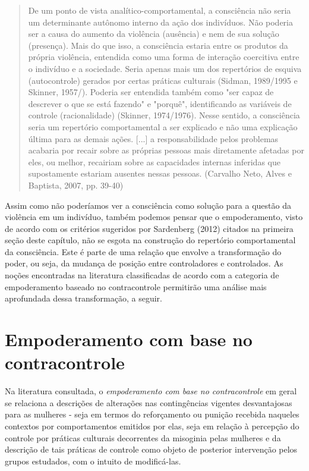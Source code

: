 \begin{quote}
    De um ponto de vista analítico-comportamental, a consciência não seria um determinante autônomo interno da ação dos indivíduos. Não poderia ser a causa do aumento da violência (ausência) e nem de sua solução (presença). Mais do que isso, a consciência estaria entre os produtos da própria violência, entendida como uma forma de interação coercitiva entre o indivíduo e a sociedade. Seria apenas mais um dos repertórios de esquiva (autocontrole) gerados por certas práticas culturais (Sidman, 1989/1995 e Skinner, 1957/). Poderia ser entendida também como "ser capaz de descrever o que se está fazendo" e "porquê", identificando as variáveis de controle (racionalidade) (Skinner, 1974/1976). Nesse sentido, a consciência seria um repertório comportamental a ser explicado e não uma explicação última para as demais ações. [...] a responsabilidade pelos problemas acabaria por recair sobre as próprias pessoas mais diretamente afetadas por eles, ou melhor, recairiam sobre as capacidades internas inferidas que supostamente estariam ausentes nessas pessoas. (Carvalho Neto, Alves e Baptista, 2007, pp. 39-40)
\end{quote}

Assim como não poderíamos ver a consciência como solução para a questão da violência em um indivíduo, também podemos pensar que o empoderamento, visto de acordo com os critérios sugeridos por Sardenberg (2012) citados na primeira seção deste capítulo, não se esgota na construção do repertório comportamental da consciência. Este é parte de uma relação que envolve a transformação do poder, ou seja, da mudança de posição entre controladores e controlados. As noções encontradas na literatura classificadas de acordo com a categoria de empoderamento baseado no contracontrole permitirão uma análise mais aprofundada dessa transformação, a seguir.

\section{Empoderamento com base no contracontrole}

Na literatura consultada, o \textit{empoderamento com base no contracontrole} em geral se relaciona a descrições de alterações nas contingências vigentes desvantajosas para as mulheres - seja em termos do reforçamento ou punição recebida naqueles contextos por comportamentos emitidos por elas, seja em relação à percepção do controle por práticas culturais decorrentes da misoginia pelas mulheres e da descrição de tais práticas de controle como objeto de posterior intervenção pelos grupos estudados, com o intuito de modificá-las.

